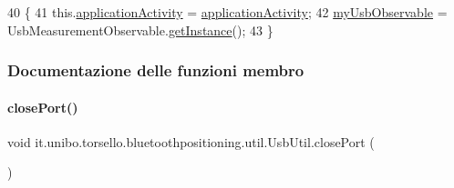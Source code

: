 \begin{DoxyCode}
40                                                             \{
41         this.\hyperlink{classit_1_1unibo_1_1torsello_1_1bluetoothpositioning_1_1util_1_1UsbUtil_afdcd78c04f043fafe29eb2cc006b5843_afdcd78c04f043fafe29eb2cc006b5843}{applicationActivity} = \hyperlink{classit_1_1unibo_1_1torsello_1_1bluetoothpositioning_1_1util_1_1UsbUtil_afdcd78c04f043fafe29eb2cc006b5843_afdcd78c04f043fafe29eb2cc006b5843}{applicationActivity};
42         \hyperlink{classit_1_1unibo_1_1torsello_1_1bluetoothpositioning_1_1util_1_1UsbUtil_a1c500d0f1a3f3a11b16015acc49929e0_a1c500d0f1a3f3a11b16015acc49929e0}{myUsbObservable} = UsbMeasurementObservable.\hyperlink{classit_1_1unibo_1_1torsello_1_1bluetoothpositioning_1_1observables_1_1UsbMeasurementObservable_aff4f89490f3f2c11ca4feea933d12d88_aff4f89490f3f2c11ca4feea933d12d88}{getInstance}();
43     \}
\end{DoxyCode}


\subsubsection{Documentazione delle funzioni membro}
\hypertarget{classit_1_1unibo_1_1torsello_1_1bluetoothpositioning_1_1util_1_1UsbUtil_acfc389f97d1eae6eabe803bf16b49f7d_acfc389f97d1eae6eabe803bf16b49f7d}{}\label{classit_1_1unibo_1_1torsello_1_1bluetoothpositioning_1_1util_1_1UsbUtil_acfc389f97d1eae6eabe803bf16b49f7d_acfc389f97d1eae6eabe803bf16b49f7d} 
\paragraph{\texorpdfstring{close\+Port()}{closePort()}}
{\footnotesize\ttfamily void it.\+unibo.\+torsello.\+bluetoothpositioning.\+util.\+Usb\+Util.\+close\+Port (\begin{DoxyParamCaption}{ }\end{DoxyParamCaption})\hspace{0.3cm}{\ttfamily [private]}}


